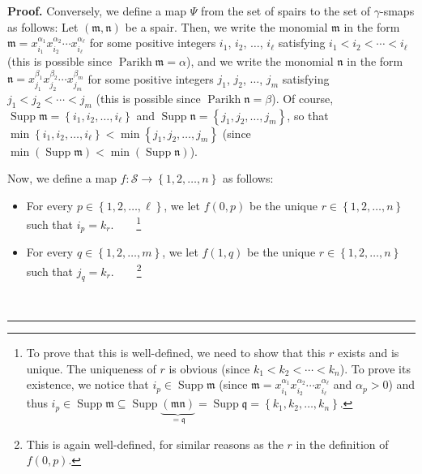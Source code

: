 \documentclass
[numbers=enddot,12pt,final,onecolumn,notitlepage,abstracton]{scrartcl}%
\theoremstyle{definition}
\newenvironment{proof}[1][Proof]{\noindent\textbf{#1.} }{\ \rule{0.5em}{0.5em}}
\newenvironment{verlong}{}{}
\begin{document}
\begin{proof}
\begin{verlong}
Conversely, we define a map $\Psi$ from the set of spairs to the set of
$\gamma$-smaps as follows: Let $\left(  \mathfrak{m},\mathfrak{n}\right)  $ be
a spair. Then, we write the monomial $\mathfrak{m}$ in the form $\mathfrak{m}%
=x_{i_{1}}^{\alpha_{1}}x_{i_{2}}^{\alpha_{2}}\cdots x_{i_{\ell}}^{\alpha
_{\ell}}$ for some positive integers $i_{1}$, $i_{2}$, $\ldots$, $i_{\ell}$
satisfying $i_{1}<i_{2}<\cdots<i_{\ell}$ (this is possible since
$\operatorname*{Parikh}\mathfrak{m}=\alpha$), and we write the monomial
$\mathfrak{n}$ in the form $\mathfrak{n}=x_{j_{1}}^{\beta_{1}}x_{j_{2}}%
^{\beta_{2}}\cdots x_{j_{m}}^{\beta_{m}}$ for some positive integers $j_{1}$,
$j_{2}$, $\ldots$, $j_{m}$ satisfying $j_{1}<j_{2}<\cdots<j_{m}$ (this is
possible since $\operatorname*{Parikh}\mathfrak{n}=\beta$). Of course,
$\operatorname*{Supp}\mathfrak{m}=\left\{  i_{1},i_{2},\ldots,i_{\ell
}\right\}  $ and $\operatorname*{Supp}\mathfrak{n}=\left\{  j_{1},j_{2}%
,\ldots,j_{m}\right\}  $, so that $\min\left\{  i_{1},i_{2},\ldots,i_{\ell
}\right\}  <\min\left\{  j_{1},j_{2},\ldots,j_{m}\right\}  $ (since
$\min\left(  \operatorname*{Supp}\mathfrak{m}\right)  <\min\left(
\operatorname*{Supp}\mathfrak{n}\right)  $).

Now, we define a map $f:\mathcal{S}\rightarrow\left\{  1,2,\ldots,n\right\}  $
as follows:

\begin{itemize}
\item For every $p\in\left\{  1,2,\ldots,\ell\right\}  $, we let $f\left(
0,p\right)  $ be the unique $r\in\left\{  1,2,\ldots,n\right\}  $ such that
$i_{p}=k_{r}$.\ \ \ \ \footnote{To prove that this is well-defined, we need to
show that this $r$ exists and is unique. The uniqueness of $r$ is obvious
(since $k_{1}<k_{2}<\cdots<k_{n}$). To prove its existence, we notice that
$i_{p}\in\operatorname*{Supp}\mathfrak{m}$ (since $\mathfrak{m}=x_{i_{1}%
}^{\alpha_{1}}x_{i_{2}}^{\alpha_{2}}\cdots x_{i_{\ell}}^{\alpha_{\ell}}$ and
$\alpha_{p}>0$) and thus $i_{p}\in\operatorname*{Supp}\mathfrak{m}%
\subseteq\operatorname*{Supp}\underbrace{\left(  \mathfrak{mn}\right)
}_{=\mathfrak{q}}=\operatorname*{Supp}\mathfrak{q}=\left\{  k_{1},k_{2}%
,\ldots,k_{n}\right\}  $.}

\item For every $q\in\left\{  1,2,\ldots,m\right\}  $, we let $f\left(
1,q\right)  $ be the unique $r\in\left\{  1,2,\ldots,n\right\}  $ such that
$j_{q}=k_{r}$.\ \ \ \ \footnote{This is again well-defined, for similar
reasons as the $r$ in the definition of $f\left(  0,p\right)  $.}
\end{itemize}


\end{verlong}
\end{proof}
\end{document}
